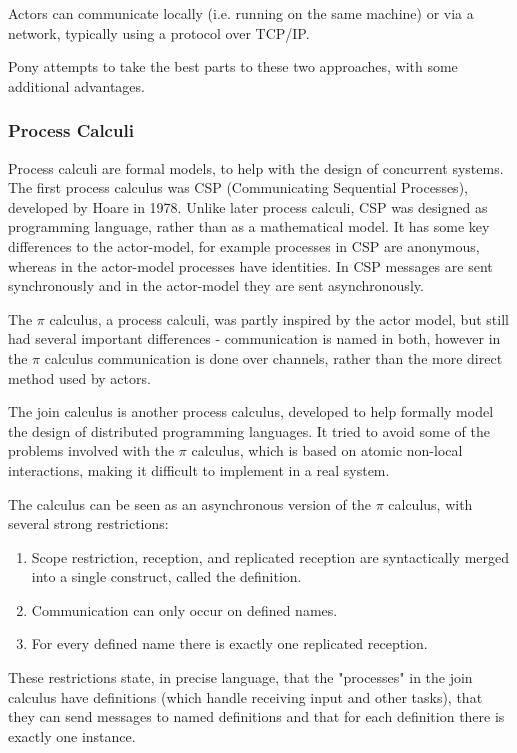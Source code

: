 \documentclass{article}
\begin{document}
Actors can communicate locally (i.e. running on the same machine) or via a network, typically using a protocol over TCP/IP.

Pony attempts to take the best parts to these two approaches, with some additional advantages.

\subsubsection{Process Calculi}

Process calculi are formal models, to help with the design of concurrent systems.
The first process calculus was CSP (Communicating Sequential Processes), developed by Hoare in 1978\cite{hoare1978}.
Unlike later process calculi, CSP was designed as programming language, rather than as a mathematical model.
It has some key differences to the actor-model, for example processes in CSP are anonymous, whereas in the actor-model processes have identities.
In CSP messages are sent synchronously and in the actor-model they are sent asynchronously.

The $\pi$ calculus, a process calculi, was partly inspired by the actor model, but still had several important differences - communication is named in both, however in the $\pi$ calculus communication is done over channels, rather than the more direct method used by actors.

The join calculus is another process calculus, developed to help formally model the design of distributed programming languages\cite{fournet1996}.
It tried to avoid some of the problems involved with the $\pi$ calculus\cite{milner1989}, which is based on atomic non-local interactions, making it difficult to implement in a real system.

The calculus can be seen as an asynchronous version of the $\pi$ calculus, with several strong restrictions\cite{fournet1996}:
\begin{enumerate}[noitemsep]
	\item Scope restriction, reception, and replicated reception are syntactically merged into a single construct, called the definition.
	\item Communication can only occur on defined names.
	\item For every defined name there is exactly one replicated reception.
\end{enumerate}

These restrictions state, in precise language, that the "processes" in the join calculus have definitions (which handle receiving input and other tasks), that they can send messages to named definitions and that for each definition there is exactly one instance.
\end{document}
